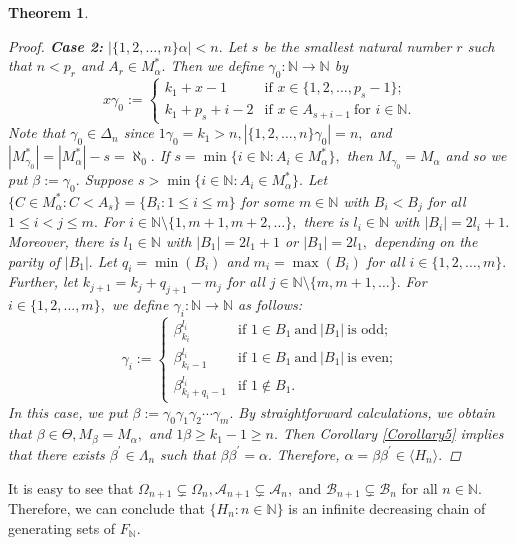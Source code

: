 \documentclass[11pt]{article}
\theoremstyle{plain}
\newtheorem{theorem}{Theorem}[section]
\theoremstyle{definition}
\begin{document}
\begin{theorem}
\begin{proof}
\noindent\textbf{Case 2:} $\left\vert \{1,2,\ldots,n\}\alpha\right\vert<n.$ Let $s$ be the smallest natural number $r$ such that $n<p_{r}$ and $A_{r}\in M_{\alpha}^{*}.$ Then we define $\gamma_{0}:\mathbb{N}\to\mathbb{N}$ by
$$x\gamma_{0}:=\begin{cases}
k_{1}+x-1~~~~~~~&\text{if }x\in\{1,2,\ldots,p_{s}-1\};\\
k_{1}+p_{s}+i-2&\text{if }x\in A_{s+i-1}~\text{for }i\in\mathbb{N}.
\end{cases}$$
Note that $\gamma_{0}\in\Delta_{n}$ since $1\gamma_{0}=k_{1}>n,\left\vert\{1,2,\ldots,n\}\gamma_{0}\right\vert=n,$ and $\left\vert M_{\gamma_{0}}^{*}\right\vert=\left\vert M_{\alpha}^{*}\right\vert-s=\aleph_{0}.$ If $s=\min\{i\in\mathbb{N}: A_{i}\in M_{\alpha}^{*}\},$ then $M_{\gamma_{0}}=M_{\alpha}$ and so we put $\beta:=\gamma_{0}.$ Suppose $s>\min\{i\in\mathbb{N}: A_{i}\in M_{\alpha}^{*}\}.$ Let $\{C\in M_{\alpha}^{*}:C<A_{s}\}=\{B_{i}:1\leq i\leq m\}$ for some $m\in\mathbb{N}$ with $B_{i}<B_{j}$ for all $1\leq i<j\leq m.$ For $i\in\mathbb{N}\setminus\{1,m+1,m+2,\ldots\},$ there is $l_{i}\in\mathbb{N}$ with $\left\vert B_{i}\right\vert=2l_{i}+1.$ Moreover, there is $l_{1}\in\mathbb{N}$ with $\left\vert B_{1}\right\vert=2l_{1}+1$ or $\left\vert B_{1}\right\vert=2l_{1},$ depending on the parity of $\left\vert B_{1}\right\vert.$ Let $q_{i}=\min(B_{i})$ and $m_{i}=\max(B_{i})$ for all $i\in\{1,2,\ldots,m\}.$ Further, let $k_{j+1}=k_{j}+q_{j+1}-m_{j}$ for all $j\in\mathbb{N}\setminus\{m,m+1,\ldots\}.$ For $i\in\{1,2,\ldots,m\},$ we define $\gamma_{i}:\mathbb{N}\to\mathbb{N}$ as follows:
$$\gamma_{i}:=\begin{cases}
\beta_{k_{i}}^{l_{i}}~~&\text{if }1\in B_{1}~\text{and}~\left\vert B_{1}\right\vert~\text{is odd;}\\
\beta_{k_{i}-1}^{l_{i}}&\text{if }1\in B_{1}~\text{and}~\left\vert B_{1}\right\vert~\text{is even;}\\
\beta_{k_{i}+q_{i}-1}^{l_{i}}&\text{if }1\not\in B_{1}.
\end{cases}$$ 
In this case, we put $\beta:=\gamma_{0}\gamma_{1}\gamma_{2}\cdots\gamma_{m}.$ By straightforward calculations, we obtain that $\beta\in\Theta,M_{\beta}=M_{\alpha},$ and $1\beta\geq k_{1}-1\geq n.$  Then Corollary \ref{Corollary5} implies that there exists $\beta^{'}\in\Lambda_{n}$ such that $\beta\beta^{'}=\alpha.$ Therefore, $\alpha=\beta\beta^{'}\in\langle H_{n}\rangle.$
\end{proof}
\end{theorem}
It is easy to see that $\Omega_{n+1}\subsetneq\Omega_{n},\mathcal{A}_{n+1}\subsetneq\mathcal{A}_{n},$ and $\mathcal{B}_{n+1}\subsetneq\mathcal{B}_{n}$ for all $n\in\mathbb{N}.$ Therefore, we can conclude that $\{H_{n}:n\in\mathbb{N}\}$ is an infinite decreasing chain of generating sets of $F_{\mathbb{N}}.$
\end{document}

